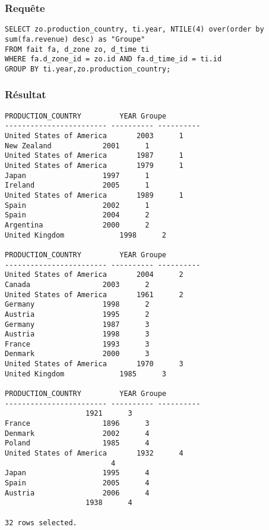 \subsubsection{Requête}
\begin{lstlisting}
SELECT zo.production_country, ti.year, NTILE(4) over(order by sum(fa.revenue) desc) as "Groupe"
FROM fait fa, d_zone zo, d_time ti
WHERE fa.d_zone_id = zo.id AND fa.d_time_id = ti.id
GROUP BY ti.year,zo.production_country;

\end{lstlisting}
\subsubsection{Résultat}
\begin{lstlisting}
PRODUCTION_COUNTRY	       YEAR	Groupe
------------------------ ---------- ----------
United States of America       2003	     1
New Zealand		       2001	     1
United States of America       1987	     1
United States of America       1979	     1
Japan			       1997	     1
Ireland 		       2005	     1
United States of America       1989	     1
Spain			       2002	     1
Spain			       2004	     2
Argentina		       2000	     2
United Kingdom		       1998	     2

PRODUCTION_COUNTRY	       YEAR	Groupe
------------------------ ---------- ----------
United States of America       2004	     2
Canada			       2003	     2
United States of America       1961	     2
Germany 		       1998	     2
Austria 		       1995	     2
Germany 		       1987	     3
Austria 		       1998	     3
France			       1993	     3
Denmark 		       2000	     3
United States of America       1970	     3
United Kingdom		       1985	     3

PRODUCTION_COUNTRY	       YEAR	Groupe
------------------------ ---------- ----------
			       1921	     3
France			       1896	     3
Denmark 		       2002	     4
Poland			       1985	     4
United States of America       1932	     4
					     4
Japan			       1995	     4
Spain			       2005	     4
Austria 		       2006	     4
			       1938	     4

32 rows selected.

\end{lstlisting}
